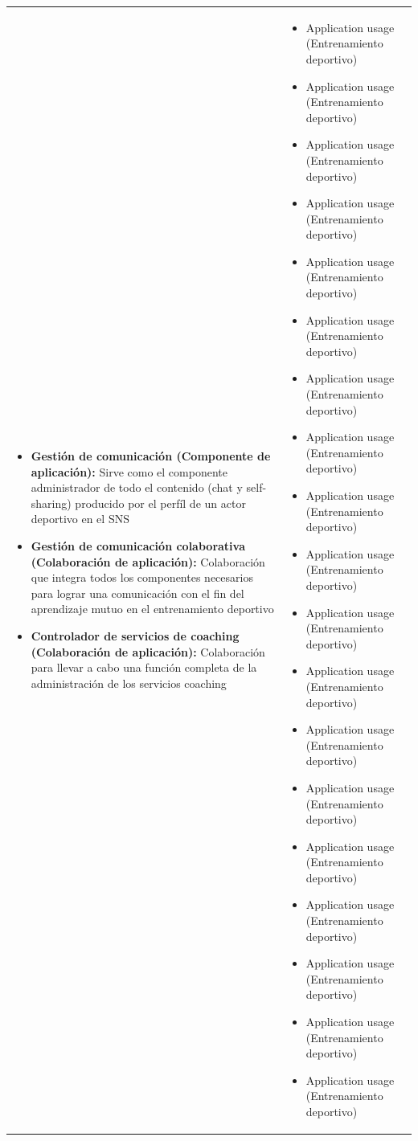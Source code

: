 \begin{table}[!htb]
\begin{center}
{\begin{tabular}{|p{7cm}|p{4cm}|}
\begin{itemize}
				\item \textbf{Gestión de comunicación (Componente de aplicación):} Sirve como el componente administrador de todo el contenido (chat y self-sharing) producido por el perfíl de un actor deportivo en el SNS
				\item \textbf{Gestión de comunicación colaborativa (Colaboración de aplicación):} Colaboración que integra todos los componentes necesarios para lograr una comunicación con el fin del aprendizaje mutuo en el entrenamiento deportivo
				\item \textbf{Controlador de servicios de coaching (Colaboración de aplicación):} Colaboración para llevar a cabo una función completa de la administración de los servicios coaching
			\end{itemize} 
			&
			\begin{itemize}
				\item Application usage (Entrenamiento deportivo)
				\item Application usage (Entrenamiento deportivo)
				\item Application usage (Entrenamiento deportivo)
				\item Application usage (Entrenamiento deportivo)
				\item Application usage (Entrenamiento deportivo)
				\item Application usage (Entrenamiento deportivo)
				\item Application usage (Entrenamiento deportivo)
				\item Application usage (Entrenamiento deportivo)
				\item Application usage (Entrenamiento deportivo)
				\item Application usage (Entrenamiento deportivo) 
				\item Application usage (Entrenamiento deportivo)
				\item Application usage (Entrenamiento deportivo)
				\item Application usage (Entrenamiento deportivo)
				\item Application usage (Entrenamiento deportivo)
				\item Application usage (Entrenamiento deportivo)
				\item Application usage (Entrenamiento deportivo)
				\item Application usage (Entrenamiento deportivo)
				\item Application usage (Entrenamiento deportivo)
				\item Application usage (Entrenamiento deportivo)

\end{itemize}
\end{tabular}}
\end{center}
\end{table}
